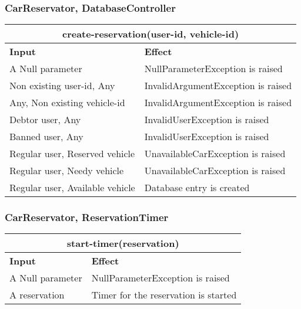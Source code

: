 \subsubsection{CarReservator, DatabaseController} 
\begin{tabular}{|p{5cm}|p{7cm}|}
\hline
\multicolumn{2}{|c|}{create-reservation(user-id, vehicle-id)} \\
\hline
\textbf{Input} & \textbf{Effect} \\

\hline
A Null parameter & NullParameterException is raised \\

\hline
Non existing user-id, Any & InvalidArgumentException is raised \\

\hline
Any, Non existing vehicle-id & InvalidArgumentException is raised \\

\hline
Debtor user, Any & InvalidUserException is raised \\

\hline
Banned user, Any & InvalidUserException is raised \\

\hline
Regular user, Reserved vehicle & UnavailableCarException is raised \\

\hline
Regular user, Needy vehicle & UnavailableCarException is raised \\

\hline
Regular user, Available vehicle & Database entry is created \\
\hline
\end{tabular}


\subsubsection{CarReservator, ReservationTimer}
\begin{tabular}{|p{5cm}|p{7cm}|}
\hline
\multicolumn{2}{|c|}{start-timer(reservation)} \\
\hline
\textbf{Input} & \textbf{Effect} \\
A Null parameter & NullParameterException is raised \\

\hline
A reservation & Timer for the reservation is started \\
\hline
\end{tabular}

